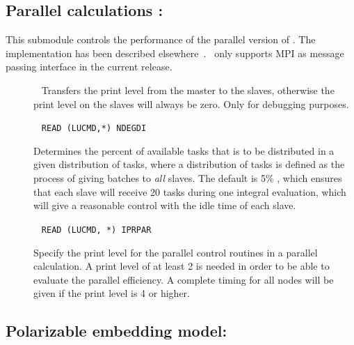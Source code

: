\subsection{Parallel calculations : }

This submodule controls the performance of the parallel
version
of \dalton . The implementation has been described
elsewhere~\cite{pndjhapdkrthhkcpl253}. \dalton\ only supports MPI as
message passing interface in the current release.

\begin{description}

\item[]\verb| |
Transfers the print level from the master
to the slaves, otherwise the print level on the slaves will always be
zero. Only for debugging purposes.

\item[]\verb| |\newline
\verb|READ (LUCMD,*) NDEGDI|

Determines the percent of available tasks that
is to be distributed in
a given distribution of tasks, where a distribution of tasks is defined
as the process of giving batches to {\em all} slaves. The default is
5\% , which ensures that each slave will receive 20 tasks during one
integral evaluation, which will give a reasonable control with the
idle time of each slave.

\item[]\verb| |\newline
\verb|READ (LUCMD, *) IPRPAR|

Specify the print level for the parallel control routines in a parallel calculation.
A print level of at least 2 is needed in order to be able to evaluate the
parallel efficiency. A complete
timing for all nodes will be given if the print level is 4 or higher.
\end{description}

\subsection{Polarizable embedding model: }
\label{subsec:pelib} 

